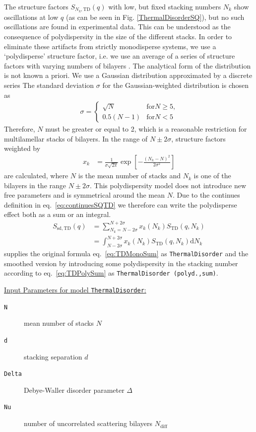 The structure factors $S_{N_k,\mathrm{TD}}(q)$ with low, but fixed
stacking numbers $N_k$ show oscillations at low $q$ (as can be seen in
Fig. \ref{ThermalDisorderSQ}), but no such oscillations are found in
experimental data. This can be understood as the consequence of
polydispersity in the size of the different stacks. In order to
eliminate these artifacts from strictly monodisperse systems, we use
a `polydisperse' structure factor, i.e. we use an average of a
series of structure factors with varying numbers of bilayers
\cite{Fruhwirth2004}. The analytical form of the distribution is not
known a priori. We use a Gaussian distribution approximated by a
discrete series The standard deviation $\sigma$ for the
Gaussian-weighted distribution is chosen as
\begin{align}
\sigma =
\begin{cases}
\sqrt{N} & \text{for} N\geq 5 \text{,} \\
0.5(N-1) & \text{for} N< 5
\end{cases}
\end{align}
Therefore, $N$ must be greater or equal to 2, which is a
reasonable restriction for multilamellar stacks of bilayers. In
the range of $N \pm 2\sigma$, structure factors weighted by
\begin{align}
x_k & = \frac{1}{\sigma\sqrt{2\pi}} \exp\left[
-\frac{(N_k-N)^2}{2\sigma^2}\right]
\end{align}
are calculated, where $N$ is the mean number of stacks and $N_k$
is one of the  bilayers in the range $N\pm 2\sigma$. This
polydispersity model does not introduce new free parameters and is
symmetrical around the mean $N$. Due to the continues definition in eq.\ \ref{eq:continuesSQTD} we therefore can write the polydisperse effect both as a sum or an integral.
\begin{align}
  S_\mathrm{sd,TD}(q) & = \sum_{N_k=N-2\sigma}^{N+2\sigma} x_k(N_k) S_\mathrm{TD}(q,N_k) \label{eq:TDPolySum} \\
                      & = \int_{N-2\sigma}^{N+2\sigma} x_k(N_k) S_\mathrm{TD}(q,N_k) \mathrm{d}N_k
\end{align}
\SASfit supplies the original formula eq.\ \ref{eq:TDMonoSum} as  \texttt{ThermalDisorder} and the smoothed version by introducing some polydispersity in the stacking number according to eq.\ \ref{eq:TDPolySum} as \texttt{ThermalDisorder (polyd.,sum)}.


\vspace{5mm}

\noindent
\underline{Input Parameters for model \texttt{ThermalDisorder}:}
\begin{description}
\item[\texttt{N}] mean number of stacks $N$
\item[\texttt{d}] stacking separation $d$
\item[\texttt{Delta}]  Debye-Waller disorder parameter $\Delta$
\item[\texttt{Nu}]   number of uncorrelated scattering bilayers $N_\text{diff}$
\end{description}

